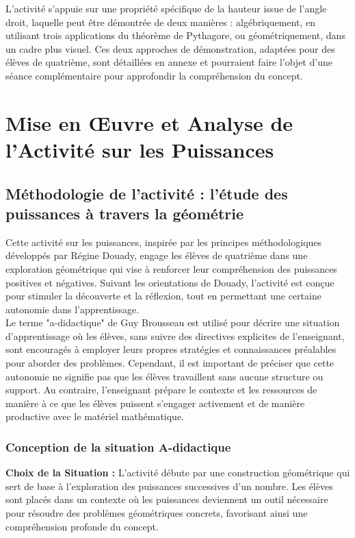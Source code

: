 L'activité s'appuie sur une propriété  spécifique de la hauteur issue de l'angle
droit, laquelle peut être démontrée de deux manières : algébriquement, en
utilisant trois applications du théorème de Pythagore, ou géométriquement, dans
un cadre plus visuel. Ces deux approches de démonstration, adaptées pour des
élèves de quatrième, sont détaillées en annexe et pourraient faire l'objet d'une
séance complémentaire pour approfondir la compréhension du concept.

\section{Mise en Œuvre et Analyse de l'Activité sur les Puissances}

\subsection{Méthodologie de l'activité : l'étude des puissances à travers la géométrie}

Cette activité sur les puissances,
inspirée par les principes méthodologiques développés par Régine Douady,
engage les élèves de quatrième dans une exploration géométrique qui vise à renforcer leur compréhension des puissances positives et négatives.
Suivant les orientations de Douady,
l'activité est conçue pour stimuler la découverte et la réflexion,
tout en permettant une certaine autonomie dans l'apprentissage.\\

Le terme "a-didactique" de Guy Brousseau \cite{brousseau} est utilisé pour décrire une situation d'apprentissage où les élèves,
sans suivre des directives explicites de l'enseignant,
sont encouragés à employer leurs propres stratégies et connaissances préalables pour aborder des problèmes.
Cependant,
il est important de préciser que cette autonomie ne signifie pas que les élèves travaillent sans aucune structure ou support.
Au contraire,
l'enseignant prépare le contexte et les ressources de manière à ce que les élèves puissent s'engager activement et de manière productive avec le matériel mathématique.

\subsubsection{Conception de la situation A-didactique}

\textbf{Choix de la Situation :}
L'activité débute par une construction géométrique qui sert de base à l'exploration des puissances successives d'un nombre.
Les élèves sont placés dans un contexte où les puissances deviennent un outil nécessaire pour résoudre des problèmes géométriques concrets,
favorisant ainsi une compréhension profonde du concept.\\

